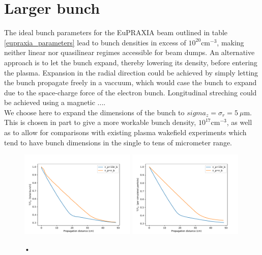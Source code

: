 \section{Larger bunch}
The ideal bunch parameters for the EuPRAXIA beam outlined in table \ref{eupraxia_parameters} lead to bunch densities in excess of $10^{20} \text{cm}^{-3}$, making neither linear nor quasilinear regimes accessible for beam dumps. An alternative approach is to let the bunch expand, thereby lowering its density, before entering the plasma. Expansion in the radial direction could be achieved by simply letting the bunch propagate freely in a vaccuum, which would case the bunch to expand due to the space-charge force of the electron bunch. Longitudinal streching could be achieved using a magnetic .... \\
We choose here to expand the dimensions of the bunch to $sigma_z=\sigma_r=5~\mu\text{m}$. This is chosen in part to give a more workable bunch density, $10^{17} \text{cm}^{-3}$, as well as to allow for comparisons with existing plasma wakefield experiments which tend to have bunch dimensions in the single to tens of micrometer range. 
\begin{figure}
\centering
\includegraphics[width=0.49\textwidth]{Energies30pc_lowres.pdf}
\includegraphics[width=0.49\textwidth]{Energy30pc_per_particle_lowres.pdf}
\caption{•}
\end{figure}

